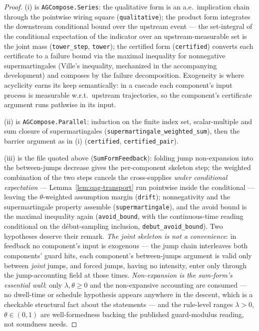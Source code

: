 \begin{proof}
(i) is \texttt{AGCompose.Series}: the qualitative form is an a.e.\
implication chain through the pointwise wiring square
(\texttt{qualitative}); the product form integrates the downstream
conditional bound over the upstream event --- the set-integral of the
conditional expectation of the indicator over an upstream-measurable
set is the joint mass (\texttt{tower\_step}, \texttt{tower}); the
certified form (\texttt{certified}) converts each certificate to a
failure bound via the maximal inequality for nonnegative
supermartingales (Ville's inequality, mechanized in the accompanying
development) and composes by the failure decomposition. Exogeneity is
where acyclicity earns its keep semantically: in a cascade each
component's input process is measurable w.r.t.\ upstream trajectories,
so the component's certificate argument runs pathwise in its input.

(ii) is \texttt{AGCompose.Parallel}: induction on the finite index
set, scalar-multiple and sum closure of supermartingales
(\texttt{supermartingale\_weighted\_sum}), then the barrier argument
as in (i) (\texttt{certified}, \texttt{certified\_pair}).

(iii) is the file quoted above (\texttt{SumFormFeedback}): folding
jump non-expansion into the between-jumps decrease gives the
per-component skeleton step; the weighted combination of the two steps
cancels the cross-supplies \emph{under conditional expectation} ---
Lemma~\ref{lem:qag-transport} run pointwise inside the conditional ---
leaving the $\theta$-weighted assumption margin (\texttt{drift});
nonnegativity and the supermartingale property assemble
(\texttt{supermartingale}), and the avoid bound is the maximal
inequality again (\texttt{avoid\_bound}, with the continuous-time
reading conditional on the d\'ebut-sampling inclusion,
\texttt{debut\_avoid\_bound}). Two hypotheses deserve their remark.
\emph{The joint skeleton is not a convenience}: in feedback no
component's input is exogenous --- the jump chain interleaves both
components' guard hits, each component's between-jumps argument is
valid only between \emph{joint} jumps, and forced jumps, having no
intensity, enter only through the jump-accounting field at those
times. \emph{Non-expansion is the sum-form's essential wall}: only
$\lambda, \theta \geq 0$ and the non-expansive accounting are consumed
--- no dwell-time or schedule hypothesis appears anywhere in the
descent, which is a checkable structural fact about the statements ---
and the rule-level ranges $\lambda > 0$, $\theta \in (0,1)$ are
well-formedness backing the published guard-modulus reading, not
soundness needs.
\end{proof}

